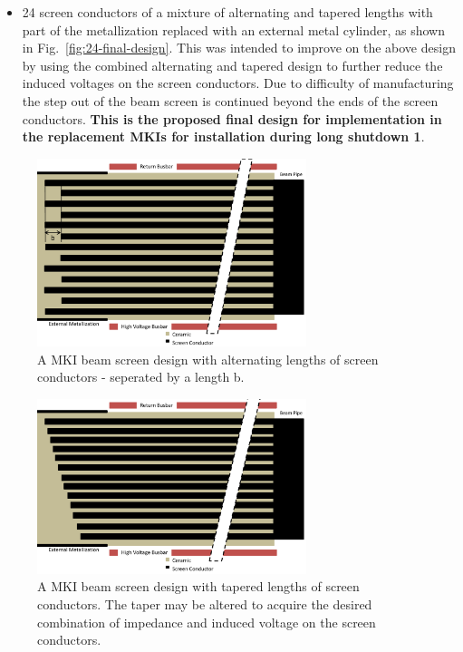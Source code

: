 \begin{itemize}
\item{24 screen conductors of a mixture of alternating and tapered lengths with part of the metallization replaced with an external metal cylinder, as shown in Fig.~\ref{fig:24-final-design}. This was intended to improve on the above design by using the combined alternating and tapered design to further reduce the induced voltages on the screen conductors. Due to difficulty of manufacturing the step out of the beam screen is continued beyond the ends of the screen conductors. \textbf{This is the proposed final design for implementation in the replacement MKIs for installation during long shutdown 1}.}
\end{itemize}

\begin{figure}
\begin{center}
\includegraphics[width=0.7\textwidth]{LHC_MKI/figures/mki-design-layouts/alternating_screen_conductors.pdf}
\end{center}
\label{fig:24-alternating-length}
\caption{A MKI beam screen design with alternating lengths of screen conductors - seperated by a length b.}

\end{figure}
\begin{figure}
\begin{center}
\includegraphics[width=0.7\textwidth]{LHC_MKI/figures/mki-design-layouts/shortening_screen_conductors.pdf}
\end{center}
\label{fig:24-tapered-length}
\caption{A MKI beam screen design with tapered lengths of screen conductors. The taper may be altered to acquire the desired combination of impedance and induced voltage on the screen conductors.}
\end{figure}
